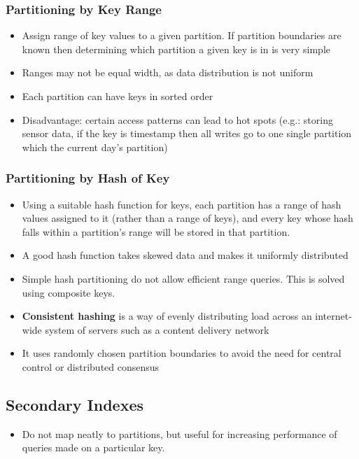 \documentclass{article}
\begin{document}
\subsubsection{Partitioning by Key Range}
\begin{itemize}
    \item Assign range of key values to a given partition. If partition boundaries are known then determining which partition a given key is in is very simple
    
    \item Ranges may not be equal width, as data distribution is not uniform
    
    \item Each partition can have keys in sorted order
    
    \item Disadvantage: certain access patterns can lead to hot spots (e.g.: storing sensor data, if the key is timestamp then all writes go to one single partition which the current day's partition)
\end{itemize}

\subsubsection{Partitioning by Hash of Key}
\begin{itemize}
    \item Using a suitable hash function for keys, each partition has a range of hash values assigned to it (rather than a range of keys), and every key whose hash falls within a partition’s range will be stored in that partition.
    
    \item A good hash function takes skewed data and makes it uniformly distributed
    
    \item Simple hash partitioning do not allow efficient range queries. This is solved using composite keys. 
    
    \item \textbf{Consistent hashing} is a way of evenly distributing load across an internet-wide system of servers such as a content delivery network
    
    \item It uses randomly chosen partition boundaries to avoid the need for central control or distributed consensus
\end{itemize}

\subsection{Secondary Indexes}
\begin{itemize}
    \item Do not map neatly to partitions, but useful for increasing performance of queries made on a particular key.
\end{itemize}
\end{document}
